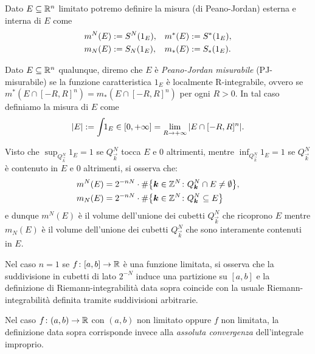 \begin{definition}
Dato $E\subseteq {\mathbb R}^n$ limitato potremo definire la misura (di Peano-Jordan) esterna 
e interna di $E$ come 
\begin{align*}
 m^N(E) &:= S^N(1_E), & m^*(E) &:= S^*(1_E),\\
 m_N(E) &:= S_N(1_E), & m_*(E) &:= S_*(1_E).
\end{align*}

Dato $E\subseteq {\mathbb R}^n$ qualunque,
diremo che $E$ è \emph{Peano-Jordan misurabile} 
(PJ-misurabile) se la funzione caratteristica $1_E$ è localmente 
R-integrabile,
ovvero se $m^*(E\cap[-R,R]^n) = m_*(E\cap[-R,R]^n)$ per ogni $R>0$.
In tal caso definiamo la misura di $E$ come 
\[
{\left|E\right|} := \int\!\! 1_E \in [0,+\infty] = \lim_{R\to+\infty} {\left|E\cap[-R,R]^n\right|}.
\]
\end{definition}


\begin{remark}
Visto che $\sup_{Q^N_{\vec k}} 1_E = 1$ se $Q^N_{\vec k}$ tocca $E$ e $0$ altrimenti,
mentre $\inf_{Q^N_{\vec k}} 1_E = 1$ se $Q^N_{\vec k}$ è contenuto in $E$
e $0$ altrimenti,
si osserva che:
\begin{align*}
 m^N(E) &= 2^{-nN} \cdot \# {\left\{ \boldsymbol k\in {\mathbb Z}^N\colon Q_{\boldsymbol k}^N \cap E \neq \emptyset \right\}},\\
  m_N(E) &= 2^{-nN} \cdot \# {\left\{ \boldsymbol k\in {\mathbb Z}^N\colon Q_{\boldsymbol k}^N \subseteq E \right\}}
\end{align*}
e dunque $m^N(E)$ è il volume dell'unione dei cubetti $Q^N_{\vec k}$ che ricoprono $E$ 
mentre $m_N(E)$ è il volume dell'unione dei cubetti $Q^N_{\vec k}$ che sono 
interamente contenuti in $E$.
\end{remark}

\begin{remark}[caso $n=1$]
Nel caso $n=1$ se $f\colon [a,b]\to {\mathbb R}$ è una funzione limitata,
si osserva che la suddivisione in cubetti di lato $2^{-N}$ induce una partizione 
su $[a,b]$ e la definizione di Riemann-integrabilità data sopra coincide con la 
usuale Riemann-integrabilità definita tramite suddivisioni arbitrarie.

Nel caso $f\colon(a,b)\to {\mathbb R}$ con $(a,b)$ non limitato oppure $f$ non limitata,
la definizione data sopra corrisponde invece alla \emph{assoluta convergenza} 
dell'integrale improprio.
\end{remark}

